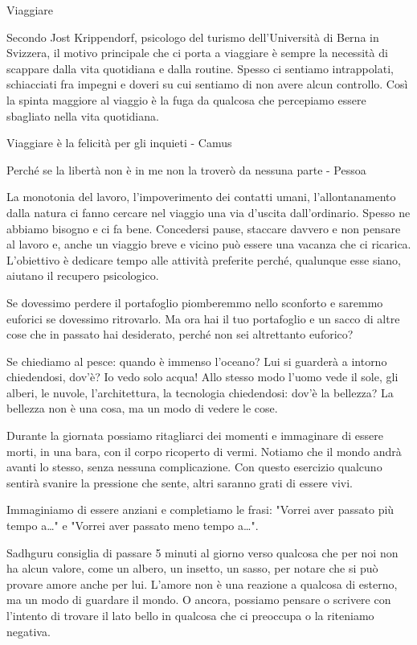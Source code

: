\documentclass[12pt]{book} %
\begin{document}
\begin{mdframed}[linewidth=1pt]
Viaggiare

Secondo Jost Krippendorf, psicologo del turismo dell'Università di Berna in Svizzera, il motivo principale che ci porta
a viaggiare è sempre la necessità di scappare dalla vita quotidiana e dalla routine. Spesso ci sentiamo intrappolati,
schiacciati fra impegni e doveri su cui sentiamo di non avere alcun controllo. Così la spinta maggiore al viaggio è la
fuga da qualcosa che percepiamo essere sbagliato nella vita quotidiana. 

Viaggiare è la felicità per gli inquieti - Camus

Perché se la libertà non è in me non la troverò da nessuna parte - Pessoa

La monotonia del lavoro, l'impoverimento dei contatti umani, l'allontanamento dalla natura ci fanno cercare nel viaggio
una via d'uscita dall'ordinario. Spesso ne abbiamo bisogno e ci fa bene. Concedersi pause, staccare davvero e non
pensare al lavoro e, anche un viaggio breve e vicino può essere una vacanza che ci ricarica. L{}'obiettivo è dedicare
tempo alle attività preferite perché, qualunque esse siano, aiutano il recupero psicologico. 
\end{mdframed}

Se dovessimo perdere il portafoglio piomberemmo nello sconforto e saremmo euforici se dovessimo ritrovarlo. Ma ora hai
il tuo portafoglio e un sacco di altre cose che in passato hai desiderato, perché non sei altrettanto euforico?

Se chiediamo al pesce: quando è immenso l'oceano? Lui si guarderà a intorno chiedendosi, dov'è? Io
vedo solo acqua! Allo stesso modo l'uomo vede il sole, gli alberi, le nuvole,
l'architettura, la tecnologia chiedendosi: dov'è la bellezza? La bellezza non è una cosa, ma un
modo di vedere le cose.

Durante la giornata possiamo ritagliarci dei momenti e immaginare di essere morti, in una bara, con il corpo ricoperto
di vermi. Notiamo che il mondo andrà avanti lo stesso, senza nessuna complicazione. Con questo esercizio qualcuno
sentirà svanire la pressione che sente, altri saranno grati di essere vivi.

Immaginiamo di essere anziani e completiamo le frasi: "Vorrei aver passato più tempo
a…" e "Vorrei aver passato meno tempo a…". 

Sadhguru consiglia di passare 5 minuti al giorno verso qualcosa che per noi non ha alcun valore, come un albero, un
insetto, un sasso, per notare che si può provare amore anche per lui. L'amore non è una reazione a qualcosa di esterno,
ma un modo di guardare il mondo. O ancora, possiamo pensare o scrivere con l'intento di trovare il
lato bello in qualcosa che ci preoccupa o la riteniamo negativa.
\end{document}
